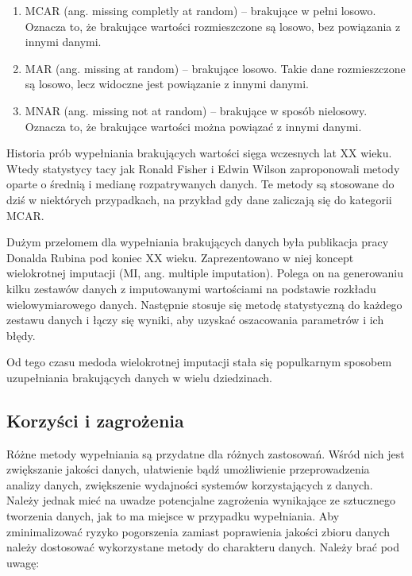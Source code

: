 \documentclass[12pt,twoside]{article}
\begin{document}
\begin{enumerate}[label=\arabic*), leftmargin=1.25cm]
    \item MCAR (ang. missing completly at random) -- brakujące w pełni losowo. Oznacza to,
          że brakujące wartości rozmieszczone są losowo, bez powiązania z innymi danymi.
    \item MAR (ang. missing at random) -- brakujące losowo. Takie dane rozmieszczone są losowo,
          lecz widoczne jest powiązanie z innymi danymi.
    \item MNAR (ang. missing not at random) -- brakujące w sposób nielosowy. Oznacza to,
          że brakujące wartości można powiązać z innymi danymi.
\end{enumerate}

Historia prób wypełniania brakujących wartości sięga wczesnych lat XX wieku.
Wtedy statystycy tacy jak Ronald Fisher i Edwin Wilson zaproponowali metody oparte o średnią i medianę
rozpatrywanych danych. Te metody są stosowane do dziś w niektórych przypadkach, na przykład gdy dane zaliczają się do kategorii
MCAR. \cite{fisher}\cite{wilson}

Dużym przełomem dla wypełniania brakujących danych była publikacja pracy Donalda Rubina pod koniec XX wieku.
Zaprezentowano w niej koncept wielokrotnej imputacji (MI, ang. multiple imputation).
Polega on na generowaniu kilku zestawów danych z imputowanymi wartościami na podstawie rozkładu
wielowymiarowego danych. Następnie stosuje się metodę statystyczną do każdego zestawu danych i łączy się wyniki,
aby uzyskać oszacowania parametrów i ich błędy. \cite{rubin}

Od tego czasu medoda wielokrotnej imputacji stała się populkarnym sposobem uzupełniania brakujących danych
w wielu dziedzinach. \cite{multi}

\subsection{Korzyści i zagrożenia}

Różne metody wypełniania są przydatne dla różnych zastosowań. Wśród nich jest zwiększanie jakości danych,
ułatwienie bądź umożliwienie przeprowadzenia analizy danych, zwiększenie wydajności systemów korzystających z danych.
Należy jednak mieć na uwadze potencjalne zagrożenia wynikające ze sztucznego tworzenia danych,
jak to ma miejsce w przypadku wypełniania.
Aby zminimalizować ryzyko pogorszenia zamiast poprawienia jakości zbioru danych należy dostosować wykorzystane metody
do charakteru danych. Należy brać pod uwagę:
\end{document}
